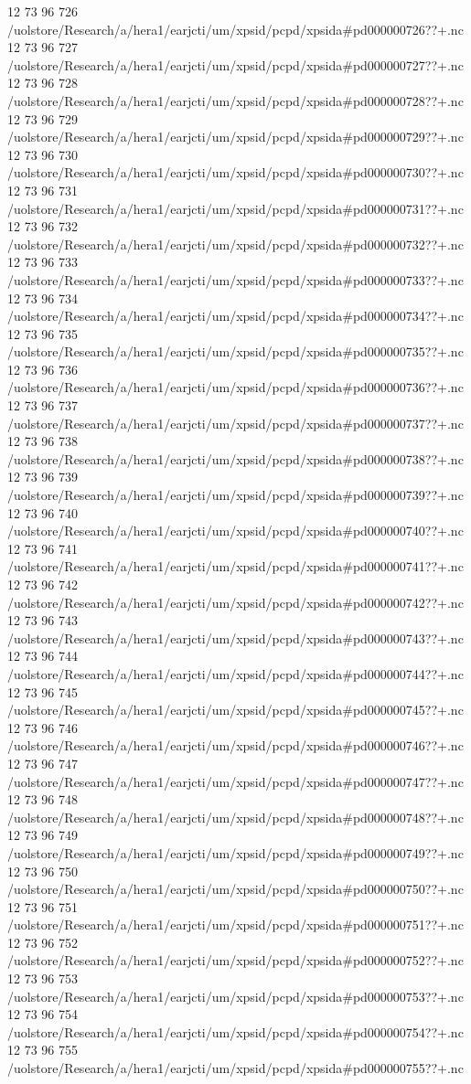 12 73 96
726
/uolstore/Research/a/hera1/earjcti/um/xpsid/pcpd/xpsida#pd000000726??+.nc
12 73 96
727
/uolstore/Research/a/hera1/earjcti/um/xpsid/pcpd/xpsida#pd000000727??+.nc
12 73 96
728
/uolstore/Research/a/hera1/earjcti/um/xpsid/pcpd/xpsida#pd000000728??+.nc
12 73 96
729
/uolstore/Research/a/hera1/earjcti/um/xpsid/pcpd/xpsida#pd000000729??+.nc
12 73 96
730
/uolstore/Research/a/hera1/earjcti/um/xpsid/pcpd/xpsida#pd000000730??+.nc
12 73 96
731
/uolstore/Research/a/hera1/earjcti/um/xpsid/pcpd/xpsida#pd000000731??+.nc
12 73 96
732
/uolstore/Research/a/hera1/earjcti/um/xpsid/pcpd/xpsida#pd000000732??+.nc
12 73 96
733
/uolstore/Research/a/hera1/earjcti/um/xpsid/pcpd/xpsida#pd000000733??+.nc
12 73 96
734
/uolstore/Research/a/hera1/earjcti/um/xpsid/pcpd/xpsida#pd000000734??+.nc
12 73 96
735
/uolstore/Research/a/hera1/earjcti/um/xpsid/pcpd/xpsida#pd000000735??+.nc
12 73 96
736
/uolstore/Research/a/hera1/earjcti/um/xpsid/pcpd/xpsida#pd000000736??+.nc
12 73 96
737
/uolstore/Research/a/hera1/earjcti/um/xpsid/pcpd/xpsida#pd000000737??+.nc
12 73 96
738
/uolstore/Research/a/hera1/earjcti/um/xpsid/pcpd/xpsida#pd000000738??+.nc
12 73 96
739
/uolstore/Research/a/hera1/earjcti/um/xpsid/pcpd/xpsida#pd000000739??+.nc
12 73 96
740
/uolstore/Research/a/hera1/earjcti/um/xpsid/pcpd/xpsida#pd000000740??+.nc
12 73 96
741
/uolstore/Research/a/hera1/earjcti/um/xpsid/pcpd/xpsida#pd000000741??+.nc
12 73 96
742
/uolstore/Research/a/hera1/earjcti/um/xpsid/pcpd/xpsida#pd000000742??+.nc
12 73 96
743
/uolstore/Research/a/hera1/earjcti/um/xpsid/pcpd/xpsida#pd000000743??+.nc
12 73 96
744
/uolstore/Research/a/hera1/earjcti/um/xpsid/pcpd/xpsida#pd000000744??+.nc
12 73 96
745
/uolstore/Research/a/hera1/earjcti/um/xpsid/pcpd/xpsida#pd000000745??+.nc
12 73 96
746
/uolstore/Research/a/hera1/earjcti/um/xpsid/pcpd/xpsida#pd000000746??+.nc
12 73 96
747
/uolstore/Research/a/hera1/earjcti/um/xpsid/pcpd/xpsida#pd000000747??+.nc
12 73 96
748
/uolstore/Research/a/hera1/earjcti/um/xpsid/pcpd/xpsida#pd000000748??+.nc
12 73 96
749
/uolstore/Research/a/hera1/earjcti/um/xpsid/pcpd/xpsida#pd000000749??+.nc
12 73 96
750
/uolstore/Research/a/hera1/earjcti/um/xpsid/pcpd/xpsida#pd000000750??+.nc
12 73 96
751
/uolstore/Research/a/hera1/earjcti/um/xpsid/pcpd/xpsida#pd000000751??+.nc
12 73 96
752
/uolstore/Research/a/hera1/earjcti/um/xpsid/pcpd/xpsida#pd000000752??+.nc
12 73 96
753
/uolstore/Research/a/hera1/earjcti/um/xpsid/pcpd/xpsida#pd000000753??+.nc
12 73 96
754
/uolstore/Research/a/hera1/earjcti/um/xpsid/pcpd/xpsida#pd000000754??+.nc
12 73 96
755
/uolstore/Research/a/hera1/earjcti/um/xpsid/pcpd/xpsida#pd000000755??+.nc
